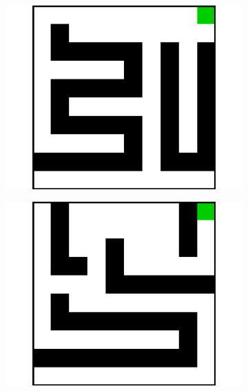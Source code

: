 \documentclass{article}
\begin{document}
\begin{figure}[t]
\centering
\begin{subfigure}[t]{0.18\textwidth}
    \includegraphics[width=\textwidth]{images/maze/maze0.pdf}
    \caption{} \label{fig:maze0}
  \end{subfigure}
  \begin{subfigure}[t]{0.18\textwidth}
    \includegraphics[width=\textwidth]{images/maze/maze1.pdf}
    \caption{}
  \end{subfigure}
  \begin{subfigure}[t]{0.18\textwidth}

\end{subfigure}
\end{figure}
\end{document}
